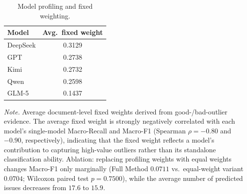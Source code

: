 \begin{table}[t]
\centering
\caption{Model profiling and fixed weighting.}
\label{tab:model_profile_weights}
\small
\begin{tabular}{lc}
\toprule
\textbf{Model} & \textbf{Avg.\ fixed weight} \\
\midrule
DeepSeek & 0.3129 \\
GPT      & 0.2738 \\
Kimi     & 0.2732 \\
Qwen     & 0.2598 \\
GLM-5    & 0.1437 \\
\bottomrule
\end{tabular}

\vspace{0.4em}
\begin{minipage}{0.95\linewidth}
\footnotesize
\textit{Note.} Average document-level fixed weights derived from good-/bad-outlier evidence. The average fixed weight is strongly negatively correlated with each model's single-model Macro-Recall and Macro-F1 (Spearman $\rho=-0.80$ and $-0.90$, respectively), indicating that the fixed weight reflects a model's contribution to capturing high-value outliers rather than its standalone classification ability. Ablation: replacing profiling weights with equal weights changes Macro-F1 only marginally (Full Method $0.0711$ vs.\ equal-weight variant $0.0704$; Wilcoxon paired test $p=0.7500$), while the average number of predicted issues decreases from $17.6$ to $15.9$.
\end{minipage}
\end{table}
